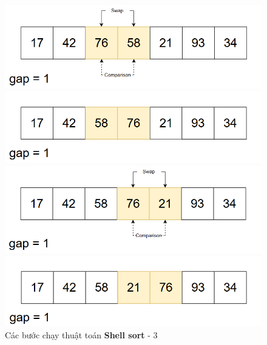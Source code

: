 \begin{figure}[H]
    \centering
    \includegraphics[width=1\linewidth]{img/shell_sort/09.png}
    \vspace{0.15cm}

    \includegraphics[width=1\linewidth]{img/shell_sort/10.png}
    \vspace{0.15cm}

    \includegraphics[width=1\linewidth]{img/shell_sort/11.png}
    \vspace{0.15cm}

    \includegraphics[width=1\linewidth]{img/shell_sort/12.png}
    \caption{Các bước chạy thuật toán \textbf{Shell sort} - 3}
\end{figure}

